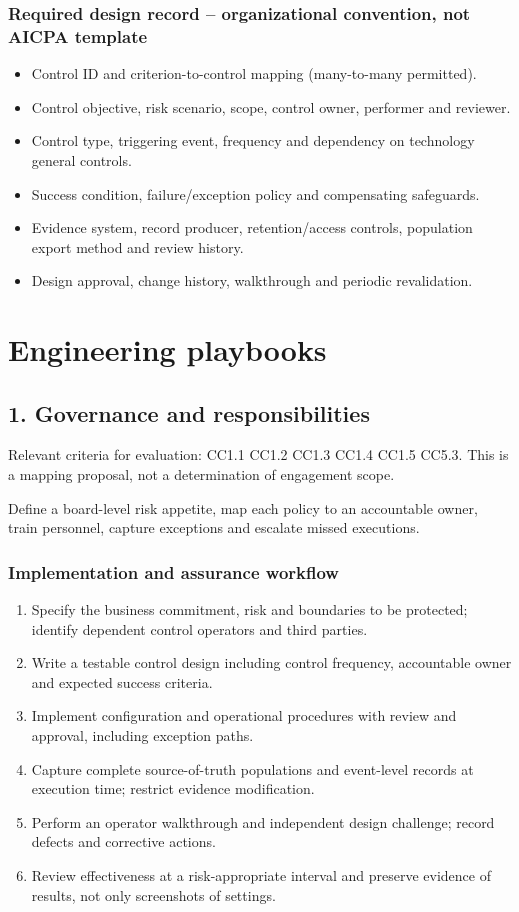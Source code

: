 \documentclass[10pt,oneside]{report}
\begin{document}
\subsection{Required design record -- organizational convention, not AICPA template}
\begin{itemize}
\item Control ID and criterion-to-control mapping (many-to-many permitted).
\item Control objective, risk scenario, scope, control owner, performer and reviewer.
\item Control type, triggering event, frequency and dependency on technology general controls.
\item Success condition, failure/exception policy and compensating safeguards.
\item Evidence system, record producer, retention/access controls, population export method and review history.
\item Design approval, change history, walkthrough and periodic revalidation.
\end{itemize}

\chapter{Engineering playbooks}
\section{1. Governance and responsibilities}
Relevant criteria for evaluation: CC1.1 CC1.2 CC1.3 CC1.4 CC1.5 CC5.3. This is a mapping proposal, not a determination of engagement scope.

\begin{engineeringbox}
Define a board-level risk appetite, map each policy to an accountable owner, train personnel, capture exceptions and escalate missed executions.
\end{engineeringbox}
\subsection{Implementation and assurance workflow}
\begin{enumerate}
\item Specify the business commitment, risk and boundaries to be protected; identify dependent control operators and third parties.
\item Write a testable control design including control frequency, accountable owner and expected success criteria.
\item Implement configuration and operational procedures with review and approval, including exception paths.
\item Capture complete source-of-truth populations and event-level records at execution time; restrict evidence modification.
\item Perform an operator walkthrough and independent design challenge; record defects and corrective actions.
\item Review effectiveness at a risk-appropriate interval and preserve evidence of results, not only screenshots of settings.
\end{enumerate}
\end{document}
